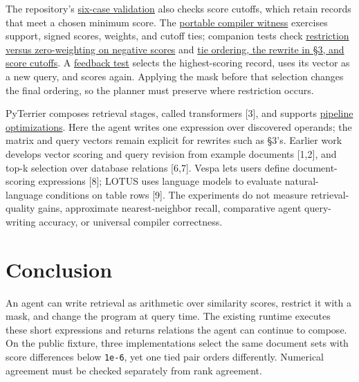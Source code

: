 \documentclass{article}
\begin{document}
The repository's \href{https://github.com/algebraicretrieval/algebraicretrieval/tree/main/proofs/pyterrier}{six-case validation} also checks score cutoffs, which retain records that meet a chosen minimum score. The \href{https://github.com/algebraicretrieval/algebraicretrieval/blob/main/tests/test_contract.py}{portable compiler witness} exercises support, signed scores, weights, and cutoff ties; companion tests check \href{https://github.com/algebraicretrieval/algebraicretrieval/blob/main/tests/test_typed_operators.py}{restriction versus zero-weighting on negative scores} and \href{https://github.com/algebraicretrieval/algebraicretrieval/blob/main/tests/test_score_semantics.py}{tie ordering, the rewrite in §3, and score cutoffs}. A \href{https://github.com/algebraicretrieval/algebraicretrieval/blob/main/tests/test_barrier_semantics.py}{feedback test} selects the highest-scoring record, uses its vector as a new query, and scores again. Applying the mask before that selection changes the final ordering, so the planner must preserve where restriction occurs.

PyTerrier composes retrieval stages, called transformers {[}3{]}, and supports \href{https://pyterrier.readthedocs.io/en/latest/transformer.html\#optimisation}{pipeline optimizations}. Here the agent writes one expression over discovered operands; the matrix and query vectors remain explicit for rewrites such as §3's. Earlier work develops vector scoring and query revision from example documents {[}1,2{]}, and top-k selection over database relations {[}6,7{]}. Vespa lets users define document-scoring expressions {[}8{]}; LOTUS uses language models to evaluate natural-language conditions on table rows {[}9{]}. The experiments do not measure retrieval-quality gains, approximate nearest-neighbor recall, comparative agent query-writing accuracy, or universal compiler correctness.

\hypertarget{conclusion}{%
\section{Conclusion}\label{conclusion}}

An agent can write retrieval as arithmetic over similarity scores, restrict it with a mask, and change the program at query time. The existing runtime executes these short expressions and returns relations the agent can continue to compose. On the public fixture, three implementations select the same document sets with score differences below \texttt{1e-6}, yet one tied pair orders differently. Numerical agreement must be checked separately from rank agreement.
\end{document}
